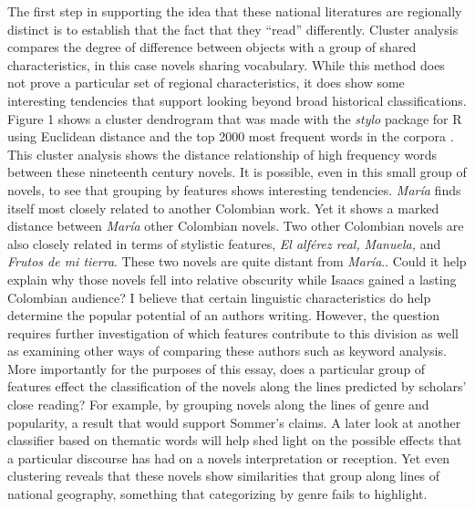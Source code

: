 \documentclass[12pt]{report}
\begin{document}
The first step in supporting the idea that these national literatures are regionally distinct is to establish that the fact that they \enquote{read} differently.
Cluster analysis compares the degree of difference between objects with a group of shared characteristics, in this case novels sharing vocabulary.
While this method does not prove a particular set of regional characteristics, it does show some interesting tendencies that support looking beyond broad historical classifications. 
Figure 1 shows a cluster dendrogram that was made with the \textit{stylo} package for R using Euclidean distance and the top 2000 most frequent words in the corpora \autocite{Eder2013, RCT2014}.
This cluster analysis shows the distance relationship of high frequency words between these nineteenth century novels.
It is possible, even in this small group of novels, to see that grouping by features shows interesting tendencies. 
\textit{María} finds itself most closely related to another Colombian work.
Yet it shows a marked distance between \textit{María} other Colombian novels.
Two other Colombian novels are also closely related in terms of stylistic features, \textit{El alférez real,} \textit{Manuela,} and \textit{Frutos de mi tierra}.
These two novels are quite distant from \textit{María}..
Could it help explain why those novels fell into relative obscurity while Isaacs gained a lasting Colombian audience?
I believe that certain linguistic characteristics do help determine the popular potential of an authors writing.
However, the question requires further investigation of which features contribute to this division as well as examining other ways of comparing these authors such as keyword analysis.
More importantly for the purposes of this essay, does a particular group of features effect the classification of the novels along the lines predicted by scholars' close reading?
For example, by grouping novels along the lines of genre and popularity, a result that would support Sommer's claims.
A later look at another classifier based on thematic words will help shed light on the possible effects that a particular discourse has had on a novels interpretation or reception.
Yet even clustering reveals that these novels show similarities that group along lines of national geography, something that categorizing by genre fails to highlight.
\end{document}
